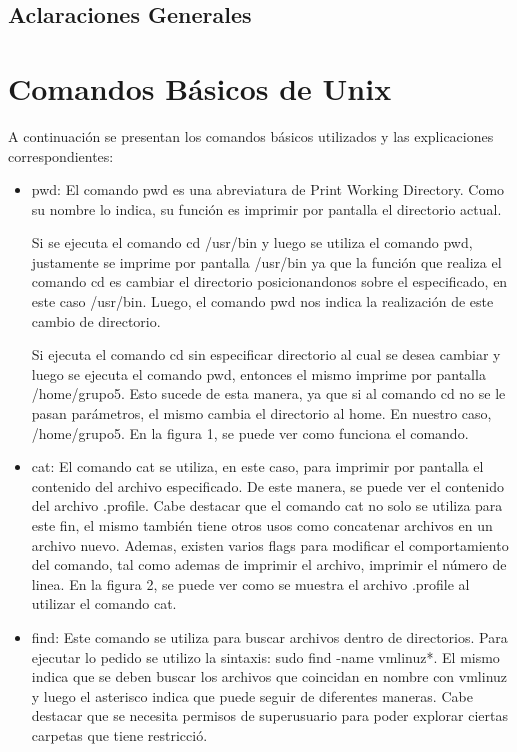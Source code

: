 \documentclass[a4paper, 12pt]{article}
\begin{document}
\tableofcontents
\newpage
\begin{center}
\section*{Aclaraciones Generales}
\end{center}

\section*{Comandos B\'asicos de Unix}

A continuaci\'on se presentan los comandos b\'asicos utilizados y las explicaciones correspondientes:
\begin{itemize}
\item pwd: El comando pwd es una abreviatura de Print Working Directory. Como su nombre lo indica, su funci\'on es imprimir por pantalla el directorio actual.

Si se ejecuta el comando cd /usr/bin y luego se utiliza el comando pwd, justamente se imprime por pantalla /usr/bin ya que la funci\'on que realiza el comando cd es cambiar el directorio posicionandonos sobre el especificado, en este caso /usr/bin. Luego, el comando pwd nos indica la realizaci\'on de este cambio de directorio.

Si ejecuta el comando cd sin especificar directorio al cual se desea cambiar y luego se ejecuta el comando pwd, entonces el mismo imprime por pantalla /home/grupo5. Esto sucede de esta manera, ya que si al comando cd no se le pasan par\'ametros, el mismo cambia el directorio al home. En nuestro caso, /home/grupo5. En la figura 1, se puede ver como funciona el comando.

\item cat: El comando cat se utiliza, en este caso, para imprimir por pantalla el contenido del archivo especificado. De este manera, se puede ver el contenido del archivo .profile. Cabe destacar que el comando cat no solo se utiliza para este fin, el mismo tambi\'en tiene otros usos como concatenar archivos en un archivo nuevo. Ademas, existen varios flags para modificar el comportamiento del comando, tal como ademas de imprimir el archivo, imprimir el n\'umero de linea. En la figura 2, se puede ver como se muestra el archivo .profile al utilizar el comando cat.

\item find: Este comando se utiliza para buscar archivos dentro de directorios. Para ejecutar lo pedido se utilizo la sintaxis: sudo find -name vmlinuz*. El mismo indica que se deben buscar los archivos que coincidan en nombre con vmlinuz y luego el asterisco indica que puede seguir de diferentes maneras. Cabe destacar que se necesita permisos de superusuario para poder explorar ciertas carpetas que tiene restricci\'o.


\end{itemize}
\end{document}
